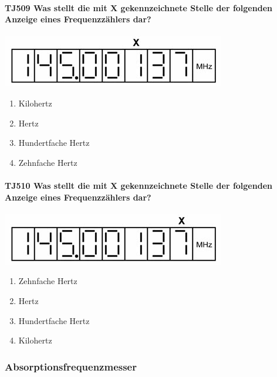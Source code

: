 \documentclass[8pt]{article}
\begin{document}
\paragraph*{TJ509 Was stellt die mit X gekennzeichnete Stelle der folgenden Anzeige eines Frequenzzählers dar?}
\begin{center}
	\begin{minipage}{\linewidth}
		\centering
		\includegraphics[scale=1.0]{pics/tj509_a.jpg}
	\end{minipage}
\end{center}
\begin{enumerate}[nolistsep,label=\Alph*]
\item Kilohertz
\item Hertz
\item Hundertfache Hertz
\item Zehnfache Hertz
\end{enumerate}

\paragraph*{TJ510 Was stellt die mit X gekennzeichnete Stelle der folgenden Anzeige eines Frequenzzählers dar?}
\begin{center}
	\begin{minipage}{\linewidth}
		\centering
		\includegraphics[scale=1.0]{pics/tj510_a.jpg}
	\end{minipage}
\end{center}
\begin{enumerate}[nolistsep,label=\Alph*]
\item Zehnfache Hertz
\item Hertz
\item Hundertfache Hertz
\item Kilohertz
\end{enumerate}

\pagebreak
\subsubsection{Absorptionsfrequenzmesser}
\end{document}
